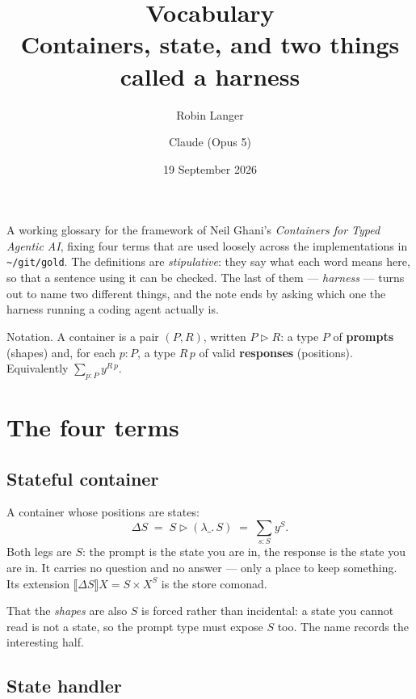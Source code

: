 \documentclass[11pt,a4paper]{article}
\title{\vspace{-14mm}\bfseries Vocabulary\\[1mm]
\large\normalfont Containers, state, and two things called a harness}
\author{\normalsize Robin Langer \and \normalsize Claude (Opus 5)}
\date{\normalsize 19 September 2026}
\newcommand{\code}[1]{\texttt{\small #1}}
\newcommand{\cont}{\mathbin{\triangleright}}
\newcommand{\sem}[1]{\llbracket #1 \rrbracket}
\newcommand{\note}{\emph{Containers for Typed Agentic AI}}
\begin{document}
\maketitle
\thispagestyle{empty}

\begin{center}
\begin{minipage}{0.88\textwidth}
\small\color{grey}
A working glossary for the framework of Neil Ghani's \note, fixing four terms that are used
loosely across the implementations in \code{\textasciitilde/git/gold}. The definitions are
\emph{stipulative}: they say what each word means here, so that a sentence using it can be
checked. The last of them --- \emph{harness} --- turns out to name two different things, and
the note ends by asking which one the harness running a coding agent actually is.
\end{minipage}
\end{center}

\vspace{3mm}

\noindent
Notation. A container is a pair $(P,R)$, written $P \cont R$: a type $P$ of \textbf{prompts}
(shapes) and, for each $p : P$, a type $R\,p$ of valid \textbf{responses} (positions).
Equivalently $\sum_{p:P} y^{R\,p}$.

\section{The four terms}

\subsection{Stateful container}

A container whose positions are states:
\[
  \Delta S \;=\; S \cont (\lambda\_.\,S) \;=\; \sum_{s:S} y^{S}.
\]
Both legs are $S$: the prompt is the state you are in, the response is the state you are in. It
carries no question and no answer --- only a place to keep something. Its extension
$\sem{\Delta S}X = S \times X^{S}$ is the store comonad.

That the \emph{shapes} are also $S$ is forced rather than incidental: a state you cannot read is
not a state, so the prompt type must expose $S$ too. The name records the interesting half.

\subsection{State handler}
\end{document}

